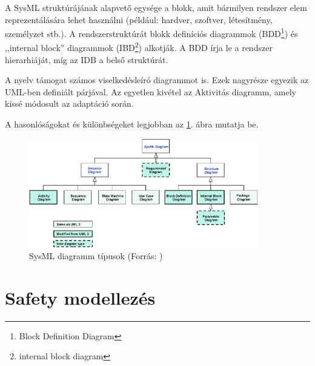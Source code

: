 A SysML struktúrájának alapvető egysége a blokk, amit bármilyen rendszer elem reprezentálására lehet használni (például: hardver, szoftver, létesítmény, személyzet stb.).
A rendszerstruktúrát blokk definíciós diagrammok (BDD\footnote{Block Definition Diagram}) és ,,internal block'' diagrammok (IBD\footnote{internal block diagram}) alkotják.
A BDD írja le a rendszer hierarhiáját, míg az IDB a belső struktúrát.

A nyelv támogat számos viselkedésleíró diagrammot is. Ezek nagyrésze egyezik az UML-ben definiált párjával.
Az egyetlen kivétel az Aktivitás diagramm, amely kissé módosult az adaptáció során.

A hasonlóságokat és különbségeket legjobban az \ref{fig:sysDiag}. ábra mutatja be.

\begin{figure}
    \footnotesize
    \centering
    \includegraphics[width=100mm, keepaspectratio]{figures/sysml_diagrams.jpg}
    \caption{SysML diagramm típusok (Forrás: \cite{omgsysml})}
    \label{fig:sysDiag}
\end{figure}

\section{Safety modellezés}